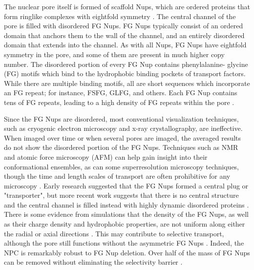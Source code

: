 The nuclear pore itself is formed of scaffold Nups, which are ordered proteins that form ringlike complexes with eightfold symmetry \cite{beck17,strambio-de-castillia10}.  The central channel of the pore is filled with disordered FG Nups.  FG Nups typically consist of an ordered domain that anchors them to the wall of the channel, and an entirely disordered domain that extends into the channel.  As with all Nups, FG Nups have eightfold symmetry in the pore, and some of them are present in much higher copy number. The disordered portion of every FG Nup contains phenylalanine- glycine (FG) motifs which bind to the hydrophobic binding pockets of transport factors.  While there are multiple binding motifs, all are short sequences which incorporate an FG repeat; for instance, FSFG, GLFG, and others.  Each FG Nup contains tens of FG repeats, leading to a high density of FG repeats within the pore \cite{strambio-de-castillia10,terry09}.

Since the FG Nups are disordered, most conventional visualization techniques, such as cryogenic electron microscopy and x-ray crystallography, are ineffective.  When imaged over time or when several pores are imaged, the averaged results do not show the disordered portion of the FG Nups. Techniques such as NMR and atomic force microscopy (AFM) can help gain insight into their conformational ensembles, as can some superresolution microscopy techniques, though the time and length scales of transport are often prohibitive for any microscopy \cite{hough15,sakiyama16,tu11}.  Early research suggested that the FG Nups formed a central plug or "transporter", but more recent work suggests that there is no central structure and the central channel is filled instead with highly dynamic disordered proteins \cite{moussavi-baygi16,schoch12,sakiyama16}. There is some evidence from simulations that the density of the FG Nups, as well as their charge density and hydrophobic properties, are not uniform along either the radial or axial directions \cite{yamada10,ando14,tagliazucchi13}.  This may contribute to selective transport, although the pore still functions without the asymmetric FG Nups \cite{zeitler04}.  Indeed, the NPC is remarkably robust to FG Nup deletion.  Over half of the mass of FG Nups can be removed without eliminating the selectivity barrier \cite{strawn04, zeitler04,kowalczyk11, jovanovic-talisman09}.

